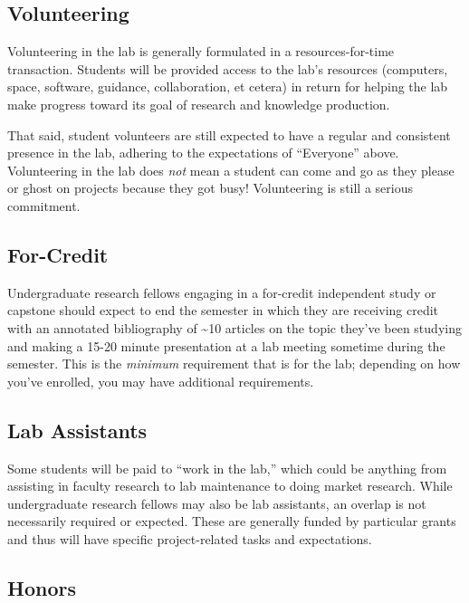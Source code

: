 \documentclass[]{tufte-book}
\begin{document}
\hypertarget{volunteering}{%
\subsection{Volunteering}\label{volunteering}}

Volunteering in the lab is generally formulated in a resources-for-time transaction. Students will be provided access to the lab's resources (computers, space, software, guidance, collaboration, et cetera) in return for helping the lab make progress toward its goal of research and knowledge production.

That said, student volunteers are still expected to have a regular and consistent presence in the lab, adhering to the expectations of ``Everyone'' above. Volunteering in the lab does \emph{not} mean a student can come and go as they please or ghost on projects because they got busy! Volunteering is still a serious commitment.

\hypertarget{for-credit}{%
\subsection{For-Credit}\label{for-credit}}

Undergraduate research fellows engaging in a for-credit independent study or capstone should expect to end the semester in which they are receiving credit with an annotated bibliography of \textasciitilde10 articles on the topic they've been studying and making a 15-20 minute presentation at a lab meeting sometime during the semester. This is the \emph{minimum} requirement that is for the lab; depending on how you've enrolled, you may have additional requirements.

\hypertarget{lab-assistants}{%
\subsection{Lab Assistants}\label{lab-assistants}}

Some students will be paid to ``work in the lab,'' which could be anything from assisting in faculty research to lab maintenance to doing market research. While undergraduate research fellows may also be lab assistants, an overlap is not necessarily required or expected. These are generally funded by particular grants and thus will have specific project-related tasks and expectations.

\hypertarget{honors}{%
\subsection{Honors}\label{honors}}
\end{document}
